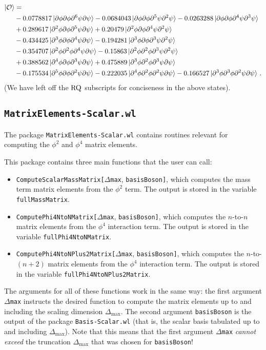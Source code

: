 \documentclass[12pt]{article}
\renewcommand{\d}{\partial}
\newcommand{\CO}{{\cal O}}
\newcommand{\nn}{\nonumber}
\begin{document}
\begin{equation}
\begin{aligned}
\ket{\CO}&=\\
&-0.0778817\ket{\d\phi\d\phi\d^6\psi\d\psi}
-0.0684043\ket{\d\phi\d\phi\d^5\psi\d^2\psi}
-0.0263288\ket{\d\phi\d\phi\d^4\psi\d^3\psi} \\
&+0.289617\ket{\d^2\phi\d\phi\d^5\psi\d\psi}
+0.20479\ket{\d^2\phi\d\phi\d^4\psi\d^2\psi}\\
&-0.434425\ket{\d^3\phi\d\phi\d^4\psi\d\psi}
-0.194281\ket{\d^3\phi\d\phi\d^3\psi\d^2\psi}\\
&-0.354707\ket{\d^2\phi\d^2\phi\d^4\psi\d\psi}
-0.15863\ket{\d^2\phi\d^2\phi\d^3\psi\d^2\psi}\\
&+0.388562\ket{\d^4\phi\d\phi\d^3\psi\d\psi}
+0.475889\ket{\d^3\phi\d^2\phi\d^3\psi\d\psi}\\
&-0.175534\ket{\d^5\phi\d\phi\d^2\psi\d\psi}
-0.222035\ket{\d^4\phi\d^2\phi\d^2\psi\d\psi}
-0.166527\ket{\d^3\phi\d^3\phi\d^2\psi\d\psi} \, .
\end{aligned}\nn
\end{equation}
(We have left off the ${\rm RQ}$ subscripts for conciseness in the above states).

\subsection{{\tt MatrixElements-Scalar.wl}} The package {\tt MatrixElements-Scalar.wl} contains routines relevant for computing the $\phi^2$ and $\phi^4$ matrix elements.

This package contains three main functions that the user can call: \begin{itemize}
	\item {\tt ComputeScalarMassMatrix[}$\Delta${\tt max}, {\tt basisBoson]}, which computes the mass term matrix elements from the $\phi^2$ term. The output is stored in the variable {\tt fullMassMatrix}.
	\item {\tt ComputePhi4NtoNMatrix[}$\Delta${\tt max}, {\tt basisBoson]}, which computes the $n$-to-$n$ matrix elements from the $\phi^4$ interaction term.  The output is stored in the variable {\tt fullPhi4NtoNMatrix}.
	\item {\tt ComputePhi4NtoNPlus2Matrix[}$\Delta${\tt max}, {\tt basisBoson]}, which computes the $n$-to-$(n+2)$ matrix elements from the $\phi^4$ interaction term. The output is stored in the variable {\tt fullPhi4NtoNPlus2Matrix}.
\end{itemize} The arguments for all of these functions work in the same way: the first argument {\tt$\Delta$max} instructs the desired function to compute the matrix elements up to and including the scaling dimension $\Delta_{\textrm{max}}$. The second argument {\tt basisBoson} is the output of the package {\tt Basis-Scalar.wl} (that is, the scalar basis tabulated up to and including $\Delta_{\textrm{max}}$). Note that this means that the first argument {\tt$\Delta$max} \textit{cannot exceed} the truncation $\Delta_{\textrm{max}}$ that was chosen for {\tt basisBoson}!
\end{document}
